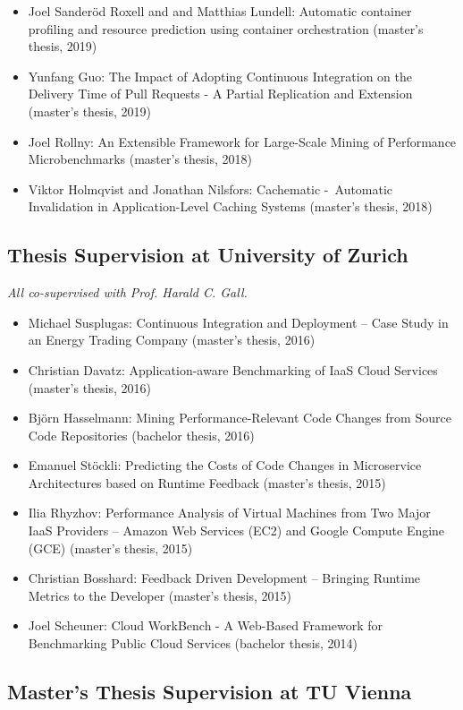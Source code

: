 \documentclass[paper=letter,fontsize=11pt]{scrartcl} %
\begin{document}
\begin{itemize}
	\item Joel Sanderöd Roxell and and Matthias Lundell: Automatic container profiling
and resource prediction using container orchestration (master's thesis, 2019)
	\item Yunfang Guo: The Impact of Adopting Continuous Integration on the Delivery Time of Pull Requests - A Partial Replication and Extension (master's thesis, 2019)
	\item Joel Rollny: An Extensible Framework for Large-Scale Mining of Performance Microbenchmarks (master's thesis, 2018)
  \item Viktor Holmqvist and Jonathan Nilsfors: Cachematic - Automatic Invalidation in Application-Level Caching Systems (master's thesis, 2018)
\end{itemize}

\subsection*{Thesis Supervision at University of Zurich}

\emph{All co-supervised with Prof. Harald C. Gall.}

\begin{itemize}
  \item Michael Susplugas: Continuous Integration and Deployment -- Case Study in an Energy Trading Company (master's thesis, 2016)
	\item Christian Davatz: Application-aware Benchmarking of IaaS Cloud Services (master's thesis, 2016)
	\item Bj\"orn Hasselmann: Mining Performance-Relevant Code Changes from Source Code Repositories (bachelor thesis, 2016)
  \item Emanuel St\"ockli: Predicting the Costs of Code Changes in Microservice Architectures based on Runtime Feedback  (master's thesis, 2015)
  \item Ilia Rhyzhov: Performance Analysis of Virtual Machines from Two Major IaaS Providers -- Amazon Web Services (EC2) and Google Compute Engine (GCE)  (master's thesis, 2015)
  \item Christian Bosshard: Feedback Driven Development -- Bringing Runtime Metrics to the Developer  (master's thesis, 2015)
  \item Joel Scheuner: Cloud WorkBench - A Web-Based Framework for Benchmarking Public Cloud Services (bachelor thesis, 2014)
\end{itemize}

\subsection*{Master's Thesis Supervision at TU Vienna}
\end{document}
